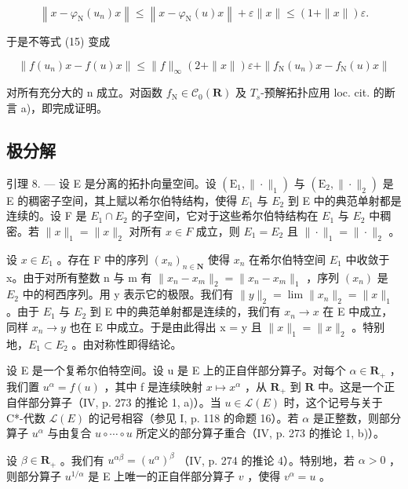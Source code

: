 \[
\left\| x - \varphi_ {\mathrm{N}} (u _ {n}) x \right\| \leqslant \left\| x - \varphi_ {\mathrm{N}} (u) x \right\| + \varepsilon \| x \| \leqslant (1 + \| x \|) \varepsilon .
\]

于是不等式 (15) 变成

\[
\| f (u _ {n}) x - f (u) x \| \leqslant \| f \| _ {\infty} (2 + \| x \|) \varepsilon + \| f _ {\mathrm{N}} (u _ {n}) x - f _ {\mathrm{N}} (u) x \|
\]

对所有充分大的 n 成立。对函数 \(f_{\mathrm{N}} \in \mathcal{C}_{0}(\mathbf{R})\) 及 \(T_{s}\)-预解拓扑应用 loc. cit. 的断言 a)，即完成证明。

\subsection{极分解}

引理 8. --- 设 E 是分离的拓扑向量空间。设 \((\mathrm{E}_{1},\|\cdot\|_{1})\) 与 \((\mathrm{E}_{2},\|\cdot\|_{2})\) 是 E 的稠密子空间，其上赋以希尔伯特结构，使得 \(E_{1}\) 与 \(E_{2}\) 到 E 中的典范单射都是连续的。设 F 是 \(E_{1}\cap E_{2}\) 的子空间，它对于这些希尔伯特结构在 \(E_{1}\) 与 \(E_{2}\) 中稠密。若 \(\|x\|_{1}=\|x\|_{2}\) 对所有 \(x\in F\) 成立，则 \(E_{1}=E_{2}\) 且 \(\|\cdot\|_{1}=\|\cdot\|_{2}\) 。

设 \(x \in E_{1}\) 。存在 F 中的序列 \((x_{n})_{n \in \mathbf{N}}\) 使得 \(x_{n}\) 在希尔伯特空间 \(E_{1}\) 中收敛于 x。由于对所有整数 n 与 m 有 \(\|x_{n} - x_{m}\|_{2} = \|x_{n} - x_{m}\|_{1}\) ，序列 \((x_{n})\) 是 \(E_{2}\) 中的柯西序列。用 y 表示它的极限。我们有 \(\|y\|_{2} = \lim\|x_{n}\|_{2} = \|x\|_{1}\) 。由于 \(E_{1}\) 与 \(E_{2}\) 到 E 中的典范单射都是连续的，我们有 \(x_{n} \to x\) 在 E 中成立，同样 \(x_{n} \to y\) 也在 E 中成立。于是由此得出 x = y 且 \(\|x\|_{1} = \|x\|_{2}\) 。特别地，\(E_{1} \subset E_{2}\) 。由对称性即得结论。

设 E 是一个复希尔伯特空间。设 u 是 E 上的正自伴部分算子。对每个 \(\alpha \in \mathbf R_{+}\) ，我们置 \(u^{\alpha} = f(u)\) ，其中 f 是连续映射 \(x \mapsto x^{\alpha}\) ，从 \(\mathbf R_{+}\) 到 \(\mathbf R\) 中。这是一个正自伴部分算子（IV, p. 273 的推论 1, a)）。当 \(u \in \mathcal{L}(E)\) 时，这个记号与关于 C*-代数 \(\mathcal{L}(E)\) 的记号相容（参见 I, p. 118 的命题 16）。若 \(\alpha\) 是正整数，则部分算子 \(u^{\alpha}\) 与由复合 \(u \circ \cdots \circ u\) 所定义的部分算子重合（IV, p. 273 的推论 1, b)）。

设 \(\beta \in \mathbf{R}_{+}\) 。我们有 \(u^{\alpha \beta} = (u^{\alpha})^{\beta}\) （IV, p. 274 的推论 4）。特别地，若 \(\alpha > 0\) ，则部分算子 \(u^{1 / \alpha}\) 是 E 上唯一的正自伴部分算子 \(v\) ，使得 \(v^{\alpha} = u\) 。

